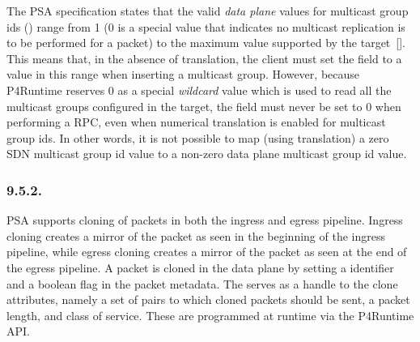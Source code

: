 \documentclass[11pt]{article}
\begin{document}
{%
\noindent{}The PSA specification states that the valid \emph{data plane} values for multicast
group ids () range from 1 (0 is a special value that indicates
no multicast replication is to be performed for a packet) to the maximum value
supported by the target~[]. This means that, in the absence of
translation, the client must set the  field to a value in
this range when inserting a multicast group. However, because P4Runtime reserves
0 as a special \emph{wildcard} value which is used to read all the multicast groups
configured in the target, the  field must never be set to 0
when performing a  RPC, even when numerical translation is enabled for
multicast group ids. In other words, it is not possible to map (using
translation) a zero SDN multicast group id value to a non-zero data plane
multicast group id value.%

\subsubsection{9.5.2.\hspace*{0.5em}}\label{sec-clonesessionentry}%

\noindent{}PSA supports cloning of packets in both the ingress and egress pipeline. Ingress
cloning creates a mirror of the packet as seen in the beginning of the ingress
pipeline, while egress cloning creates a mirror of the packet as seen at the end
of the egress pipeline. A packet is cloned in the data plane by setting a
 identifier and a boolean flag  in the packet
metadata. The  serves as a handle to the clone attributes,
namely a set  of  pairs to which
cloned packets should be sent, a packet length, and class of
service. These are programmed at runtime via the P4Runtime
 API.%

}
\end{document}

